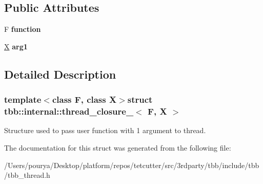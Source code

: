 \subsection*{Public Attributes}
\begin{DoxyCompactItemize}
\item 
\hypertarget{structtbb_1_1internal_1_1thread__closure__1_a39a5a39b2a7513868944ffe7ffd89640}{}F {\bfseries function}\label{structtbb_1_1internal_1_1thread__closure__1_a39a5a39b2a7513868944ffe7ffd89640}

\item 
\hypertarget{structtbb_1_1internal_1_1thread__closure__1_a607886c68ca8bdd984b9b4f6ec744dea}{}\hyperlink{structX}{X} {\bfseries arg1}\label{structtbb_1_1internal_1_1thread__closure__1_a607886c68ca8bdd984b9b4f6ec744dea}

\end{DoxyCompactItemize}


\subsection{Detailed Description}
\subsubsection*{template$<$class F, class X$>$struct tbb\+::internal\+::thread\+\_\+closure\+\_$<$ F, X $>$}

Structure used to pass user function with 1 argument to thread. 

The documentation for this struct was generated from the following file\+:\begin{DoxyCompactItemize}
\item 
/\+Users/pourya/\+Desktop/platform/repos/tetcutter/src/3rdparty/tbb/include/tbb/tbb\+\_\+thread.\+h\end{DoxyCompactItemize}
